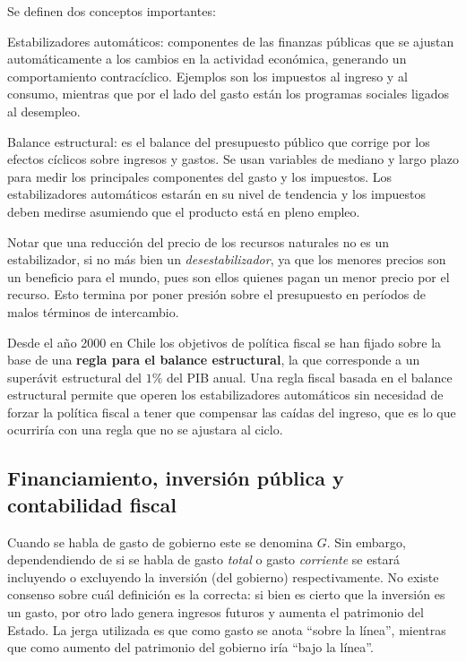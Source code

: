 \documentclass[DeGregorioResumen]{subfiles}
\begin{document}
Se definen dos conceptos importantes:

\begin{enumdescript}
\item[Estabilizadores automáticos:] componentes de las finanzas públicas que se ajustan automáticamente a los cambios en la actividad económica, generando un comportamiento contracíclico. Ejemplos son los impuestos al ingreso y al consumo, mientras que por el lado del gasto están los programas sociales ligados al desempleo.
\item[Balance estructural:] es el balance del presupuesto público que corrige por los efectos cíclicos sobre ingresos y gastos. Se usan variables de mediano y largo plazo para medir los principales componentes del gasto y los impuestos. Los estabilizadores automáticos estarán en su nivel de tendencia y los impuestos deben medirse asumiendo que el producto está en pleno empleo.
\end{enumdescript}

Notar que una reducción del precio de los recursos naturales no es un estabilizador, si no más bien un \emph{desestabilizador}, ya que los menores precios son un beneficio para el mundo, pues son ellos quienes pagan un menor precio por el recurso. Esto termina por poner presión sobre el presupuesto en períodos de malos términos de intercambio.

Desde el año 2000 en Chile los objetivos de política fiscal se han fijado sobre la base de una \textbf{regla para el balance estructural}, la que corresponde a un superávit estructural del $1\%$ del PIB anual. Una regla fiscal basada en el balance estructural permite que operen los estabilizadores automáticos sin necesidad de forzar la política fiscal a tener que compensar las caídas del ingreso, que es lo que ocurriría con una regla que no se ajustara al ciclo.

\subsection{Financiamiento, inversión pública y contabilidad fiscal}

Cuando se habla de gasto de gobierno este se denomina $G$. Sin embargo, dependendiendo de si se habla de gasto \emph{total} o gasto \emph{corriente} se estará incluyendo o excluyendo la inversión (del gobierno) respectivamente. No existe consenso sobre cuál definición es la correcta: si bien es cierto que la inversión es un gasto, por otro lado genera ingresos futuros y aumenta el patrimonio del Estado. La jerga utilizada es que como gasto se anota ``sobre la línea'', mientras que como aumento del patrimonio del gobierno iría ``bajo la línea''.
\end{document}
